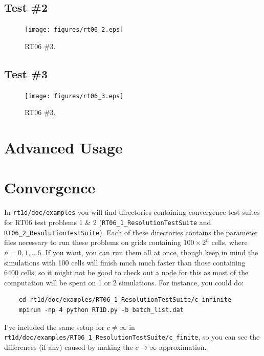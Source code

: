 \documentclass[letterpaper,titlepage,12pt]{article}
\numberwithin{equation}{section}
\begin{document}
\subsection{Test \#2}

\begin{figure}[htbp!]
\begin{center}
\texttt{[image: figures/rt06\_2.eps]}
\caption{RT06 \#3.}
\label{fig:RT06_2}
\end{center}
\end{figure}
            
\subsection{Test \#3}

\begin{figure}[htbp!]
\begin{center}
\texttt{[image: figures/rt06\_3.eps]}
\caption{RT06 \#3.}
\label{fig:RT06_3}
\end{center}
\end{figure}

\section{Advanced Usage}

\section{Convergence}
In \texttt{rt1d/doc/examples} you will find directories containing convergence test suites for RT06 test problems 1 \& 2 (\texttt{RT06\_1\_ResolutionTestSuite} and \texttt{RT06\_2\_ResolutionTestSuite}).  Each of these directories contains the parameter files necessary to run these problems on grids containing $100 \times 2^n$ cells, where $n = 0,1,...6$.  If you want, you can run them all at once, though keep in mind the simulations with 100 cells will finish much much faster than those containing 6400 cells, so it might not be good to check out a node for this as most of the computation will be spent on 1 or 2 simulations.  For instance, you could do:
\begin{verbatim}
    cd rt1d/doc/examples/RT06_1_ResolutionTestSuite/c_infinite
    mpirun -np 4 python RT1D.py -b batch_list.dat
\end{verbatim}
I've included the same setup for $c \neq \infty$ in \texttt{rt1d/doc/examples/RT06\_1\_ResolutionTestSuite/c\_finite}, so you can see the differences (if any) caused by making the $c \rightarrow \infty$ approximation.
\end{document}
